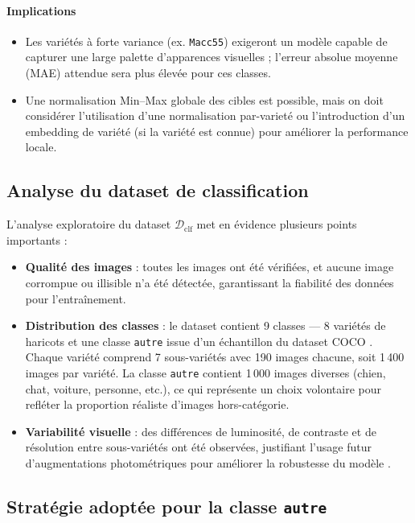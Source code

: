 \paragraph{Implications}
\begin{itemize}
    \item Les variétés à forte variance (ex. \texttt{Macc55}) exigeront un modèle capable de capturer une large palette d'apparences visuelles ; l'erreur absolue moyenne (MAE) attendue sera plus élevée pour ces classes.
    \item Une normalisation Min--Max globale des cibles est possible, mais on doit considérer l'utilisation d'une normalisation par-varieté ou l'introduction d'un embedding de variété (si la variété est connue) pour améliorer la performance locale.
\end{itemize}

\subsection{Analyse du dataset de classification}

L'analyse exploratoire du dataset \(\mathcal{D}_{\text{clf}}\) met en évidence plusieurs points importants :

\begin{itemize}
    \item \textbf{Qualité des images} : toutes les images ont été vérifiées, et aucune image corrompue ou illisible n’a été détectée, garantissant la fiabilité des données pour l’entraînement.
    \item \textbf{Distribution des classes} : le dataset contient 9 classes — 8 variétés de haricots et une classe \texttt{autre} issue d’un échantillon du dataset COCO \cite{lin2014microsoft}. Chaque variété comprend 7 sous-variétés avec 190 images chacune, soit 1 400 images par variété. La classe \texttt{autre} contient 1 000 images diverses (chien, chat, voiture, personne, etc.), ce qui représente un choix volontaire pour refléter la proportion réaliste d’images hors-catégorie.
    \item \textbf{Variabilité visuelle} : des différences de luminosité, de contraste et de résolution entre sous-variétés ont été observées, justifiant l’usage futur d’augmentations photométriques pour améliorer la robustesse du modèle \cite{shorten2019survey}.
\end{itemize}

\subsection{Stratégie adoptée pour la classe \texttt{autre}}

